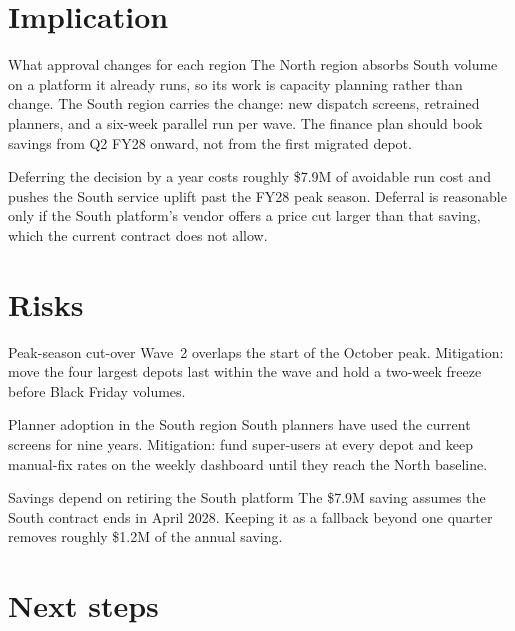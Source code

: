 \section{Implication}

\begin{decisionpoint}{What approval changes for each region}
The North region absorbs South volume on a platform it already runs, so its
work is capacity planning rather than change. The South region carries the
change: new dispatch screens, retrained planners, and a six-week parallel
run per wave. The finance plan should book savings from Q2 FY28 onward, not
from the first migrated depot.
\end{decisionpoint}

Deferring the decision by a year costs roughly \$7.9M of avoidable run cost
and pushes the South service uplift past the FY28 peak season. Deferral is
reasonable only if the South platform's vendor offers a price cut larger than
that saving, which the current contract does not allow.

\section{Risks}

\begin{redflag}{Peak-season cut-over}
Wave~2 overlaps the start of the October peak. Mitigation: move the four
largest depots last within the wave and hold a two-week freeze before
Black Friday volumes.
\end{redflag}

\begin{redflag}{Planner adoption in the South region}
South planners have used the current screens for nine years. Mitigation:
fund super-users at every depot and keep manual-fix rates on the weekly
dashboard until they reach the North baseline.
\end{redflag}

\begin{assumption}{Savings depend on retiring the South platform}
The \$7.9M saving assumes the South contract ends in April 2028. Keeping it
as a fallback beyond one quarter removes roughly \$1.2M of the annual saving.
\end{assumption}

\section{Next steps}

\begin{briefactions}
\end{briefactions}

